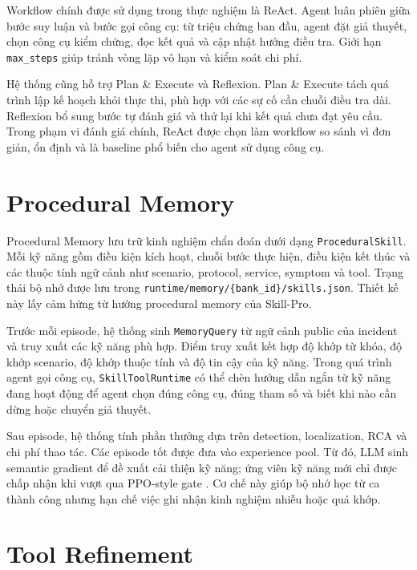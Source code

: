 Workflow chính được sử dụng trong thực nghiệm là ReAct. Agent luân phiên giữa bước suy luận và bước gọi công cụ: từ triệu chứng ban đầu, agent đặt giả thuyết, chọn công cụ kiểm chứng, đọc kết quả và cập nhật hướng điều tra. Giới hạn \texttt{max\_steps} giúp tránh vòng lặp vô hạn và kiểm soát chi phí.

Hệ thống cũng hỗ trợ Plan \& Execute và Reflexion. Plan \& Execute tách quá trình lập kế hoạch khỏi thực thi, phù hợp với các sự cố cần chuỗi điều tra dài. Reflexion bổ sung bước tự đánh giá và thử lại khi kết quả chưa đạt yêu cầu. Trong phạm vi đánh giá chính, ReAct được chọn làm workflow so sánh vì đơn giản, ổn định và là baseline phổ biến cho agent sử dụng công cụ.

\section{Procedural Memory}
\label{sec:memory_module}

Procedural Memory lưu trữ kinh nghiệm chẩn đoán dưới dạng \texttt{ProceduralSkill}. Mỗi kỹ năng gồm điều kiện kích hoạt, chuỗi bước thực hiện, điều kiện kết thúc và các thuộc tính ngữ cảnh như scenario, protocol, service, symptom và tool. Trạng thái bộ nhớ được lưu trong \texttt{runtime/memory/\{bank\_id\}/skills.json}. Thiết kế này lấy cảm hứng từ hướng procedural memory của Skill-Pro.

Trước mỗi episode, hệ thống sinh \texttt{MemoryQuery} từ ngữ cảnh public của incident và truy xuất các kỹ năng phù hợp. Điểm truy xuất kết hợp độ khớp từ khóa, độ khớp scenario, độ khớp thuộc tính và độ tin cậy của kỹ năng. Trong quá trình agent gọi công cụ, \texttt{SkillToolRuntime} có thể chèn hướng dẫn ngắn từ kỹ năng đang hoạt động để agent chọn đúng công cụ, đúng tham số và biết khi nào cần dừng hoặc chuyển giả thuyết.

Sau episode, hệ thống tính phần thưởng dựa trên detection, localization, RCA và chi phí thao tác. Các episode tốt được đưa vào experience pool. Từ đó, LLM sinh semantic gradient để đề xuất cải thiện kỹ năng; ứng viên kỹ năng mới chỉ được chấp nhận khi vượt qua PPO-style gate \cite{ppo2017}. Cơ chế này giúp bộ nhớ học từ ca thành công nhưng hạn chế việc ghi nhận kinh nghiệm nhiễu hoặc quá khớp.

\section{Tool Refinement}
\label{sec:tool_evolution}

